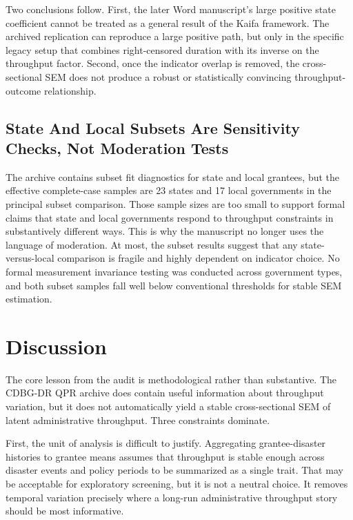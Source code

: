 \documentclass[
  letterpaper,
]{article}
\begin{document}
Two conclusions follow. First, the later Word manuscript's large
positive state coefficient cannot be treated as a general result of the
Kaifa framework. The archived replication can reproduce a large positive
path, but only in the specific legacy setup that combines right-censored
duration with its inverse on the throughput factor. Second, once the
indicator overlap is removed, the cross-sectional SEM does not produce a
robust or statistically convincing throughput-outcome relationship.

\subsection{State And Local Subsets Are Sensitivity Checks, Not
Moderation
Tests}\label{state-and-local-subsets-are-sensitivity-checks-not-moderation-tests}

The archive contains subset fit diagnostics for state and local
grantees, but the effective complete-case samples are 23 states and 17
local governments in the principal subset comparison. Those sample sizes
are too small to support formal claims that state and local governments
respond to throughput constraints in substantively different ways. This
is why the manuscript no longer uses the language of moderation. At
most, the subset results suggest that any state-versus-local comparison
is fragile and highly dependent on indicator choice. No formal
measurement invariance testing was conducted across government types,
and both subset samples fall well below conventional thresholds for
stable SEM estimation.

\section{Discussion}\label{discussion}

The core lesson from the audit is methodological rather than
substantive. The CDBG-DR QPR archive does contain useful information
about throughput variation, but it does not automatically yield a stable
cross-sectional SEM of latent administrative throughput. Three
constraints dominate.

First, the unit of analysis is difficult to justify. Aggregating
grantee-disaster histories to grantee means assumes that throughput is
stable enough across disaster events and policy periods to be summarized
as a single trait. That may be acceptable for exploratory screening, but
it is not a neutral choice. It removes temporal variation precisely
where a long-run administrative throughput story should be most
informative.
\end{document}
